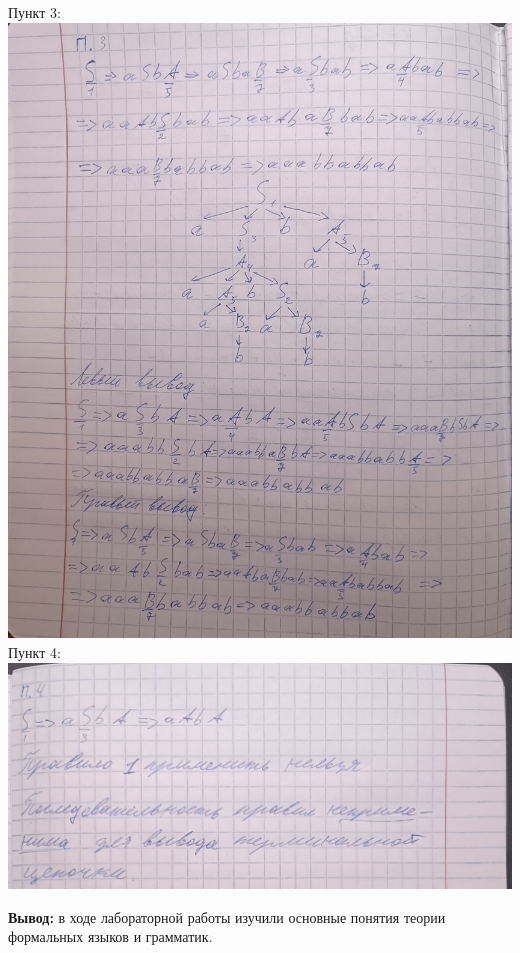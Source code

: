 \documentclass[a4paper,14pt]{extarticle}
\begin{document}
\begin{enumerate}[1.]
          Пункт 3:\\
          \includegraphics[width=140mm]{task6_3}\bigbreak
          Пункт 4:\\
          \includegraphics[width=140mm]{task6_4}\bigbreak
\end{enumerate}

\textbf{Вывод: } в ходе лабораторной работы изучили основные понятия теории формальных языков и грамматик.
\end{document}
